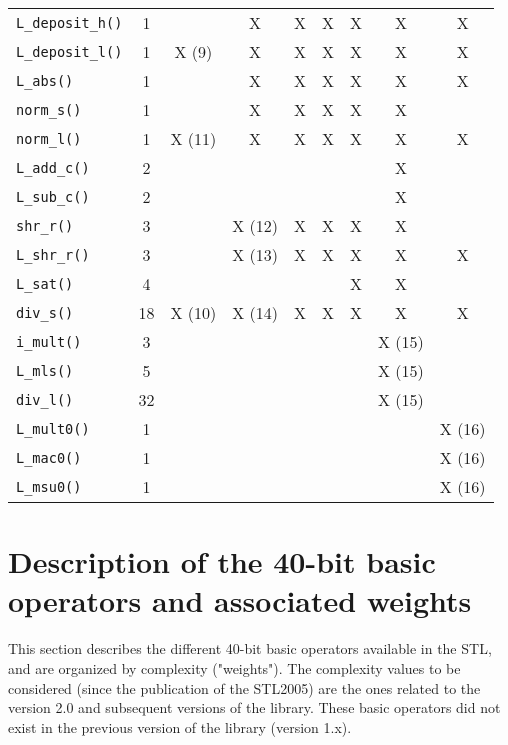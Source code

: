 \begin{table}[th]
\begin{center}
\begin{tabular}{|l|c|c|c|c|c|c|c|c|}
{\tt L\_deposit\_h()}   &1 & &X &X &X &X &X &X\\
{\tt L\_deposit\_l()}   &1 &X (9) &X &X &X &X &X &X\\
{\tt L\_abs()}  &1 & &X &X &X &X &X &X\\
{\tt norm\_s()}         &1 & &X &X &X &X &X & \\
{\tt norm\_l()} &1 &X (11) &X &X &X &X &X &X\\
{\tt L\_add\_c()}       &2 & & & & & &X & \\
{\tt L\_sub\_c()}       &2 & & & & & &X & \\
{\tt shr\_r()}  &3 & &X (12) &X &X &X &X & \\
{\tt L\_shr\_r()}       &3 & &X (13) &X &X &X &X &X\\
{\tt L\_sat()}  &4 & & & & &X &X &\\
{\tt div\_s()}  &18 &X (10) &X (14) &X &X &X &X &X\\
\hline
{\tt i\_mult()} &3 & & & & & &X (15) & \\
{\tt L\_mls()}  &5 & & & & & &X (15) & \\
{\tt div\_l()}  &32 & & & & & &X (15) & \\
\hline
{\tt L\_mult0()} &1 & & & & & & &X (16)\\
{\tt L\_mac0()}  &1 & & & & & & &X (16)\\
{\tt L\_msu0()}  &1 & & & & & & &X (16)\\
\hline
\end{tabular}
\end{center}
\end{table}

\flushfloats

\section{Description of the 40-bit basic operators and associated weights}

This section describes the different 40-bit basic operators
available in the STL, and are organized by complexity ("weights").
The complexity values to be considered (since the publication of
the STL2005) are the ones related to the version 2.0 and subsequent versions of the library. These basic operators did not exist in the previous
version of the library (version 1.x).

